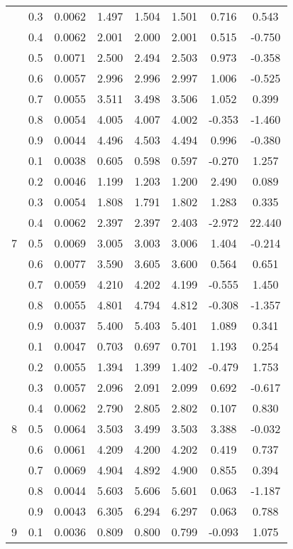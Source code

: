 \documentclass[11pt,a4paper]{report}
\begin{document}
\begin{longtable}{ | c | c || c | c | c | c | c | c | }
 & 0.3 & 0.0062 & 1.497 & 1.504 & 1.501 & 0.716 & 0.543 \\
 & 0.4 & 0.0062 & 2.001 & 2.000 & 2.001 & 0.515 & -0.750 \\
 & 0.5 & 0.0071 & 2.500 & 2.494 & 2.503 & 0.973 & -0.358 \\
 & 0.6 & 0.0057 & 2.996 & 2.996 & 2.997 & 1.006 & -0.525 \\
 & 0.7 & 0.0055 & 3.511 & 3.498 & 3.506 & 1.052 & 0.399 \\
 & 0.8 & 0.0054 & 4.005 & 4.007 & 4.002 & -0.353 & -1.460 \\
 & 0.9 & 0.0044 & 4.496 & 4.503 & 4.494 & 0.996 & -0.380 \\
 \hline
\multirow{9}{*}{7} & 0.1 & 0.0038 & 0.605 & 0.598 & 0.597 & -0.270 & 1.257 \\
 & 0.2 & 0.0046 & 1.199 & 1.203 & 1.200 & 2.490 & 0.089 \\
 & 0.3 & 0.0054 & 1.808 & 1.791 & 1.802 & 1.283 & 0.335 \\
 & 0.4 & 0.0062 & 2.397 & 2.397 & 2.403 & -2.972 & 22.440 \\
 & 0.5 & 0.0069 & 3.005 & 3.003 & 3.006 & 1.404 & -0.214 \\
 & 0.6 & 0.0077 & 3.590 & 3.605 & 3.600 & 0.564 & 0.651 \\
 & 0.7 & 0.0059 & 4.210 & 4.202 & 4.199 & -0.555 & 1.450 \\
 & 0.8 & 0.0055 & 4.801 & 4.794 & 4.812 & -0.308 & -1.357 \\
 & 0.9 & 0.0037 & 5.400 & 5.403 & 5.401 & 1.089 & 0.341 \\
 \hline
\multirow{9}{*}{8} & 0.1 & 0.0047 & 0.703 & 0.697 & 0.701 & 1.193 & 0.254 \\
 & 0.2 & 0.0055 & 1.394 & 1.399 & 1.402 & -0.479 & 1.753 \\
 & 0.3 & 0.0057 & 2.096 & 2.091 & 2.099 & 0.692 & -0.617 \\
 & 0.4 & 0.0062 & 2.790 & 2.805 & 2.802 & 0.107 & 0.830 \\
 & 0.5 & 0.0064 & 3.503 & 3.499 & 3.503 & 3.388 & -0.032 \\
 & 0.6 & 0.0061 & 4.209 & 4.200 & 4.202 & 0.419 & 0.737 \\
 & 0.7 & 0.0069 & 4.904 & 4.892 & 4.900 & 0.855 & 0.394 \\
 & 0.8 & 0.0044 & 5.603 & 5.606 & 5.601 & 0.063 & -1.187 \\
 & 0.9 & 0.0043 & 6.305 & 6.294 & 6.297 & 0.063 & 0.788 \\
 \hline
\multirow{9}{*}{9} & 0.1 & 0.0036 & 0.809 & 0.800 & 0.799 & -0.093 & 1.075 \\

\end{longtable}
\end{document}
